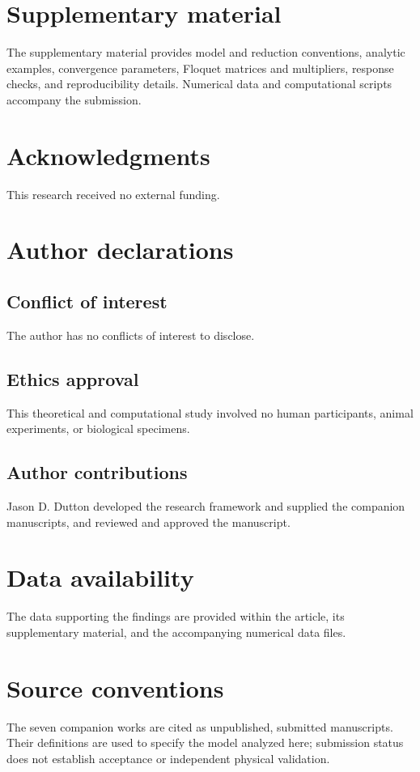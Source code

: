 \documentclass[aip,adv,preprint,floatfix]{revtex4-2}
\begin{document}
\section*{Supplementary material}
The supplementary material provides model and reduction conventions, analytic examples, convergence parameters, Floquet matrices and multipliers, response checks, and reproducibility details. Numerical data and computational scripts accompany the submission.

\section*{Acknowledgments}
This research received no external funding.

\section*{Author declarations}
\subsection*{Conflict of interest}
The author has no conflicts of interest to disclose.

\subsection*{Ethics approval}
This theoretical and computational study involved no human participants, animal experiments, or biological specimens.

\subsection*{Author contributions}
Jason D. Dutton developed the research framework and supplied the companion manuscripts, and reviewed and approved the manuscript.

\section*{Data availability}
The data supporting the findings are provided within the article, its supplementary material, and the accompanying numerical data files.

\appendix
\section{Source conventions}
The seven companion works are cited as unpublished, submitted manuscripts. Their definitions are used to specify the model analyzed here; submission status does not establish acceptance or independent physical validation.
\end{document}
